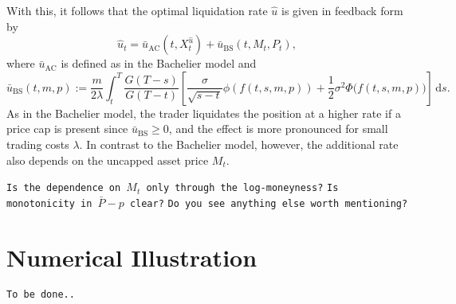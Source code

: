 \documentclass[11pt]{article}
\theoremstyle{definition}
\theoremstyle{remark}
\newcommand{\ts}{\textstyle}
\newcommand{\de}{\,\mathrm{d}}
\begin{document}
With this, it follows that the optimal liquidation rate $\hat{u}$ is given in feedback form by
\[
 \hat{u}_t = \bar{u}_{\mathrm{AC}}(t,X^{\hat{u}}_t) + \bar{u}_{\mathrm{BS}}(t,M_t,P_t),
\]
where $\bar{u}_{\mathrm{AC}}$ is defined as in the Bachelier model and
\[
 \bar{u}_{\mathrm{BS}}(t,m,p) := \frac{m}{2\lambda}\int_t^T  \frac{G(T-s)}{G(T-t)} \left[ \frac{\sigma}{\sqrt{s-t}}\phi\left(f(t,s,m,p)\right)+\frac{1}{2}\sigma^2 \Phi\bigl(f(t,s,m,p)\bigr)\right] \de s.
\]
As in the Bachelier model, the trader liquidates the position at a higher rate if a price cap is present since $\bar{u}_{\mathrm{BS}}\ge 0$, and the effect is more pronounced for small trading costs $\lambda$. In contrast to the Bachelier model, however, the additional rate also depends on the uncapped asset price $M_t$.

{\color{red}
\texttt{Is the dependence on $M_t$ only through the log-moneyness?}
\texttt{Is monotonicity in $\bar P-p$ clear?}
\texttt{Do you see anything else worth mentioning?}
}


\section{Numerical Illustration}

{\color{red}\texttt{To be done..}}




\end{document}
